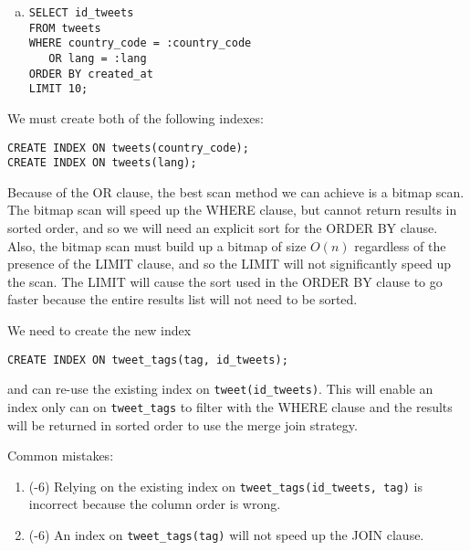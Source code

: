 \documentclass[12pt]{exam}
\theoremstyle{definition}
\begin{document}
\begin{questions}
{\begin{enumerate}[a.]
\newpage
\item
\begin{lstlisting}
SELECT id_tweets
FROM tweets
WHERE country_code = :country_code
   OR lang = :lang
ORDER BY created_at
LIMIT 10;
\end{lstlisting}
\end{enumerate}
}
\begin{solution}
We must create both of the following indexes:
\begin{lstlisting}
CREATE INDEX ON tweets(country_code);
CREATE INDEX ON tweets(lang);
\end{lstlisting}
Because of the OR clause, the best scan method we can achieve is a bitmap scan.
The bitmap scan will speed up the WHERE clause,
but cannot return results in sorted order,
and so we will need an explicit sort for the ORDER BY clause.
Also, the bitmap scan must build up a bitmap of size $O(n)$ regardless of the presence of the LIMIT clause,
and so the LIMIT will not significantly speed up the scan.
The LIMIT will cause the sort used in the ORDER BY clause to go faster because the entire results list will not need to be sorted. 
\end{solution}


\newpage
{}
\begin{solution}
We need to create the new index
\begin{lstlisting}
CREATE INDEX ON tweet_tags(tag, id_tweets);
\end{lstlisting}
and can re-use the existing index on \lstinline{tweet(id_tweets)}.
This will enable an index only can on \lstinline{tweet_tags} to filter with the WHERE clause and the results will be returned in sorted order to use the merge join strategy.

Common mistakes:
\begin{enumerate}
    \item (-6)
        Relying on the existing index on \lstinline{tweet_tags(id_tweets, tag)} is incorrect because the column order is wrong.
    \item (-6)
        An index on \lstinline{tweet_tags(tag)} will not speed up the JOIN clause.
\end{enumerate}


\end{solution}
\end{questions}
\end{document}
